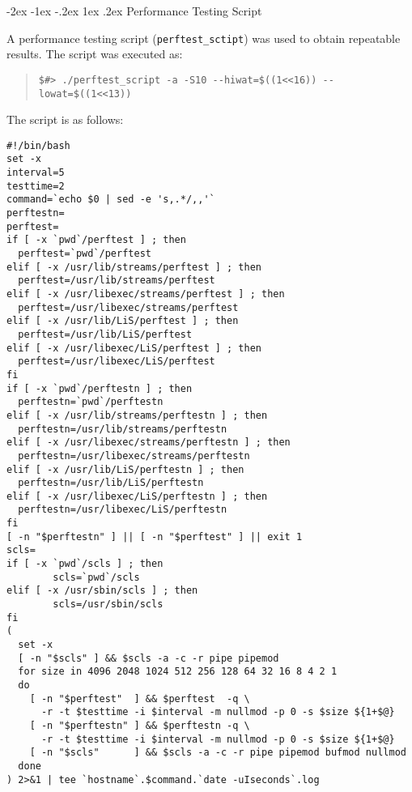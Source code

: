 \documentclass[letterpaper,final,notitlepage,twocolumn,10pt,twoside]{article}
\makeatletter
\renewcommand\section{\@startsection {section}{1}{\z@}%
                                   {-2ex \@plus -1ex \@minus -.2ex}%
                                   {1ex \@plus .2ex}%
                                   {\normalfont\large\bfseries}}
\makeatother
\begin{document}
\clearpage
\begin{appendix}

\section{Performance Testing Script}
\label{section:script}

A performance testing script (\texttt{perftest\_sctipt}) was used to obtain
repeatable results.  The script was executed as:

\begin{quote}
\footnotesize
\begin{verbatim}
$#> ./perftest_script -a -S10 --hiwat=$((1<<16)) --lowat=$((1<<13))
\end{verbatim}
\normalsize
\end{quote}

The script is as follows:

\footnotesize
\begin{verbatim}
#!/bin/bash
set -x
interval=5
testtime=2
command=`echo $0 | sed -e 's,.*/,,'`
perftestn=
perftest=
if [ -x `pwd`/perftest ] ; then
  perftest=`pwd`/perftest
elif [ -x /usr/lib/streams/perftest ] ; then
  perftest=/usr/lib/streams/perftest
elif [ -x /usr/libexec/streams/perftest ] ; then
  perftest=/usr/libexec/streams/perftest
elif [ -x /usr/lib/LiS/perftest ] ; then
  perftest=/usr/lib/LiS/perftest
elif [ -x /usr/libexec/LiS/perftest ] ; then
  perftest=/usr/libexec/LiS/perftest
fi
if [ -x `pwd`/perftestn ] ; then
  perftestn=`pwd`/perftestn
elif [ -x /usr/lib/streams/perftestn ] ; then
  perftestn=/usr/lib/streams/perftestn
elif [ -x /usr/libexec/streams/perftestn ] ; then
  perftestn=/usr/libexec/streams/perftestn
elif [ -x /usr/lib/LiS/perftestn ] ; then
  perftestn=/usr/lib/LiS/perftestn
elif [ -x /usr/libexec/LiS/perftestn ] ; then
  perftestn=/usr/libexec/LiS/perftestn
fi
[ -n "$perftestn" ] || [ -n "$perftest" ] || exit 1
scls=
if [ -x `pwd`/scls ] ; then
        scls=`pwd`/scls
elif [ -x /usr/sbin/scls ] ; then
        scls=/usr/sbin/scls
fi
(
  set -x
  [ -n "$scls" ] && $scls -a -c -r pipe pipemod
  for size in 4096 2048 1024 512 256 128 64 32 16 8 4 2 1
  do
    [ -n "$perftest"  ] && $perftest  -q \
      -r -t $testtime -i $interval -m nullmod -p 0 -s $size ${1+$@}
    [ -n "$perftestn" ] && $perftestn -q \
      -r -t $testtime -i $interval -m nullmod -p 0 -s $size ${1+$@}
    [ -n "$scls"      ] && $scls -a -c -r pipe pipemod bufmod nullmod
  done
) 2>&1 | tee `hostname`.$command.`date -uIseconds`.log
\end{verbatim}
\normalsize



\end{appendix}
\end{document}
